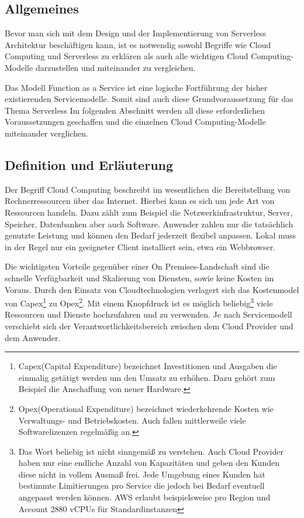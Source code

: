 \subsection{Allgemeines}

Bevor man sich mit dem Design und der Implementierung von Serverless Architektur beschäftigen kann,
ist es notwendig sowohl Begriffe wie Cloud Computing und Serverless zu erklären als auch alle wichtigen Cloud Computing-Modelle
darzustellen und miteinander zu vergleichen.

Das Modell Function as a Service ist eine logische Fortführung der bisher existierenden Servicemodelle.
Somit sind auch diese Grundvoraussetzung für das Thema Serverless
Im folgenden Abschnitt werden all diese erforderlichen Voraussetzungen geschaffen und die einzelnen Cloud Computing-Modelle miteinander verglichen.


\subsection{Definition und Erläuterung}
Der Begriff Cloud Computing beschreibt im wesentlichen die Bereitstellung von Rechnerressourcen über das Internet.
Hierbei kann es sich um jede Art von Ressourcen handeln. Dazu zählt zum Beispiel die Netzwerkinfrastruktur, Server, Speicher, Datenbanken aber auch Software.
Anwender zahlen nur die tatsächlich genutzte Leistung und können den Bedarf jederzeit flexibel anpassen. Lokal muss in der Regel nur ein
geeigneter Client installiert sein, etwa ein Webbrowser.

Die wichtigsten Vorteile gegenüber einer On Premises-Landschaft sind die schnelle Verfügbarkeit und Skalierung von Diensten, sowie keine Kosten im Voraus.
Durch den Einsatz von Cloudtechnologien verlagert sich das Kostenmodel von Capex\footnote{ Capex(Capital Expenditure) bezeichnet Investitionen und Ausgaben die einmalig getätigt werden
um den Umsatz zu erhöhen. Dazu gehört zum Beispiel die Anschaffung von neuer Hardware. } zu Opex\footnote{Opex(Operational Expenditure) bezeichnet wiederkehrende Kosten wie Verwaltungs- und Betriebskosten.
Auch fallen mittlerweile viele Softwarelizenzen regelmäßig an. }.
Mit einem Knopfdruck ist es möglich beliebig\footnote{Das Wort beliebig ist nicht sinngemäß zu verstehen. Auch Cloud Provider haben nur eine endliche
Anzahl von Kapazitäten und geben den Kunden diese nicht in vollem Ausmaß frei. Jede Umgebung eines Kunden hat bestimmte Limitierungen pro Service
die jedoch bei Bedarf eventuell angepasst werden können. AWS erlaubt beispielsweise pro Region und Account 2880 vCPUs für Standardinstanzen }
viele Ressourcen und Dienste hochzufahren und zu verwenden.
Je nach Servicemodell verschiebt sich der Verantwortlichkeitsbereich zwischen dem Cloud Provider und dem Anwender.
\cite[]{CloudComputingDef}

